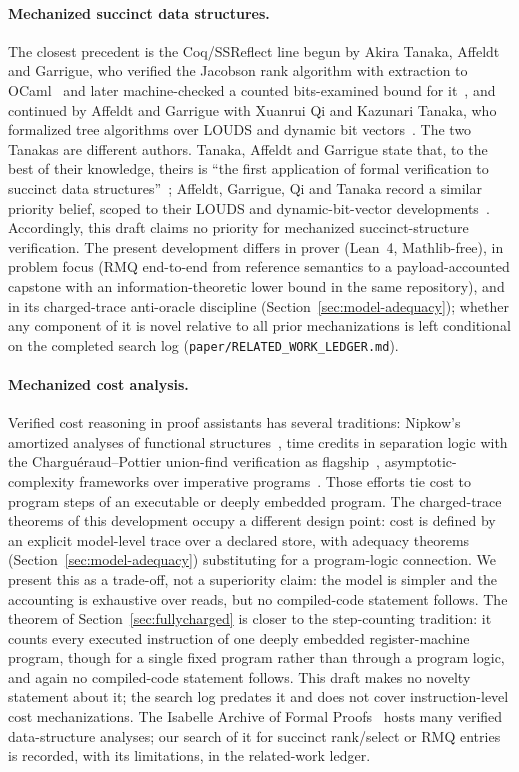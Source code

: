 \documentclass[11pt]{article}
\theoremstyle{definition}
\theoremstyle{remark}
\begin{document}
\paragraph{Mechanized succinct data structures.}
The closest precedent is the Coq/SSReflect line begun by Akira Tanaka,
Affeldt and Garrigue, who verified the Jacobson rank algorithm with
extraction to OCaml~\cite{TAG16} and later machine-checked a counted
bits-examined bound for it~\cite{TAG18}, and continued by Affeldt and
Garrigue with Xuanrui Qi and Kazunari Tanaka, who formalized tree
algorithms over LOUDS and dynamic bit vectors~\cite{AGQT19}. The two
Tanakas are different authors.
Tanaka, Affeldt and Garrigue state that, to the best of their knowledge,
theirs is ``the first application of formal verification to succinct data
structures''~\cite{TAG16}; Affeldt, Garrigue, Qi and Tanaka record a
similar priority belief, scoped to their LOUDS and dynamic-bit-vector
developments~\cite{AGQT19}. Accordingly, this draft claims no priority for
mechanized succinct-structure verification. The present development
differs in prover (Lean~4, Mathlib-free), in problem focus (RMQ end-to-end
from reference semantics to a payload-accounted capstone with an
information-theoretic lower bound in the same repository), and in its
charged-trace anti-oracle discipline (Section~\ref{sec:model-adequacy});
whether any component of it is novel relative to all prior mechanizations
is left conditional on the completed search log
(\texttt{paper/RELATED\_WORK\_LEDGER.md}).

\paragraph{Mechanized cost analysis.}
Verified cost reasoning in proof assistants has several traditions:
Nipkow's amortized analyses of functional structures~\cite{Nipkow15,
Nipkow16}, time credits in separation logic with the
Chargu\'eraud--Pottier union-find verification as flagship~\cite{CP19},
asymptotic-complexity frameworks over imperative programs~\cite{GCP18,
ZhanHaslbeck18}. Those efforts tie cost to program steps of an executable
or deeply embedded program. The charged-trace theorems of this development
occupy a different design point: cost is defined by an explicit model-level
trace over a declared store, with adequacy theorems
(Section~\ref{sec:model-adequacy}) substituting for a program-logic
connection. We present this as a trade-off, not a superiority claim: the
model is simpler and the accounting is exhaustive over reads, but no
compiled-code statement follows. The theorem of
Section~\ref{sec:fullycharged} is closer to the step-counting tradition: it
counts every executed instruction of one deeply embedded register-machine
program, though for a single fixed program rather than through a program
logic, and again no compiled-code statement follows. This draft makes no
novelty statement about it; the search log predates it and does not cover
instruction-level cost mechanizations. The Isabelle Archive of Formal
Proofs~\cite{AFP} hosts many verified data-structure analyses; our search of
it for succinct
rank/select or RMQ entries is recorded, with its limitations, in the
related-work ledger.
\end{document}
